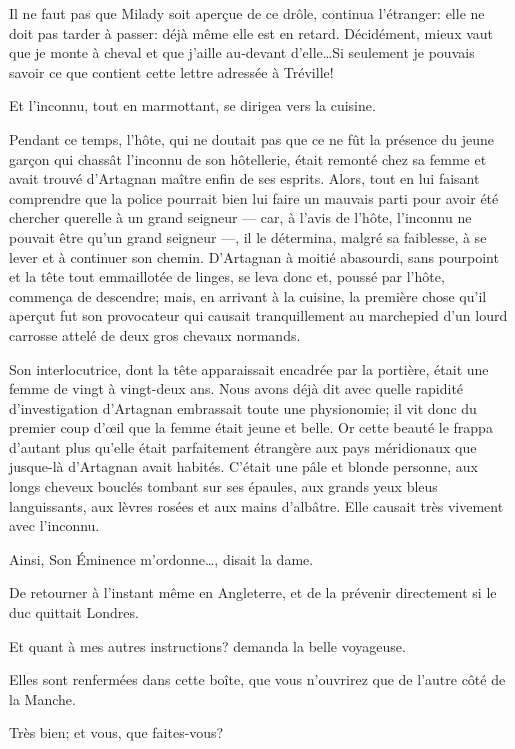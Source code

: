 \speak  Il ne faut pas que Milady soit aperçue de ce drôle, continua l'étranger: elle ne doit pas tarder à passer: déjà même elle est en retard. Décidément, mieux vaut que je monte à cheval et que j'aille au-devant d'elle\dots Si seulement je pouvais savoir ce que contient cette lettre adressée à Tréville! 

Et l'inconnu, tout en marmottant, se dirigea vers la cuisine. 

Pendant ce temps, l'hôte, qui ne doutait pas que ce ne fût la présence du jeune garçon qui chassât l'inconnu de son hôtellerie, était remonté chez sa femme et avait trouvé d'Artagnan maître enfin de ses esprits. Alors, tout en lui faisant comprendre que la police pourrait bien lui faire un mauvais parti pour avoir été chercher querelle à un grand seigneur --- car, à l'avis de l'hôte, l'inconnu ne pouvait être qu'un grand seigneur ---, il le détermina, malgré sa faiblesse, à se lever et à continuer son chemin. D'Artagnan à moitié abasourdi, sans pourpoint et la tête tout emmaillotée de linges, se leva donc et, poussé par l'hôte, commença de descendre; mais, en arrivant à la cuisine, la première chose qu'il aperçut fut son provocateur qui causait tranquillement au marchepied d'un lourd carrosse attelé de deux gros chevaux normands. 

Son interlocutrice, dont la tête apparaissait encadrée par la portière, était une femme de vingt à vingt-deux ans. Nous avons déjà dit avec quelle rapidité d'investigation d'Artagnan embrassait toute une physionomie; il vit donc du premier coup d'œil que la femme était jeune et belle. Or cette beauté le frappa d'autant plus qu'elle était parfaitement étrangère aux pays méridionaux que jusque-là d'Artagnan avait habités. C'était une pâle et blonde personne, aux longs cheveux bouclés tombant sur ses épaules, aux grands yeux bleus languissants, aux lèvres rosées et aux mains d'albâtre. Elle causait très vivement avec l'inconnu. 

\speak  Ainsi, Son Éminence m'ordonne\dots, disait la dame. 

\speak  De retourner à l'instant même en Angleterre, et de la prévenir directement si le duc quittait Londres. 

\speak  Et quant à mes autres instructions? demanda la belle voyageuse. 

\speak  Elles sont renfermées dans cette boîte, que vous n'ouvrirez que de l'autre côté de la Manche. 

\speak  Très bien; et vous, que faites-vous? 

